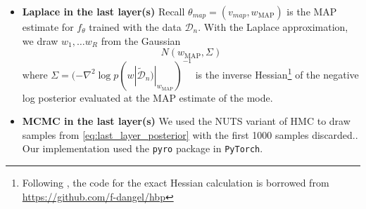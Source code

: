 \documentclass{article} %
\begin{document}
\begin{itemize}
	\item \textbf{Laplace in the last layer(s)}
	Recall $\theta_{map} = (v_{map}, w_{\operatorname{MAP}})$ is the MAP estimate for $f_\theta$ trained with the data $\mathcal D_n$. With the Laplace approximation, we draw $w_1,\ldots w_R$ from the Gaussian
	\[
	N(w_{\operatorname{MAP}}, \Sigma)
	\]
	where $\Sigma = (- \nabla^2 \log p(w| \tilde{\mathcal D}_n) |_{w_{\operatorname{MAP}}})^{-1}$ is the inverse Hessian\footnote{Following \citet{kristiadi_being_2020}, the code for the exact Hessian calculation is borrowed from \url{https://github.com/f-dangel/hbp}} of the negative log posterior evaluated at the MAP estimate of the mode.
	\item \textbf{MCMC in the last layer(s)}
	We used the NUTS variant of HMC to draw samples from \eqref{eq:last_layer_posterior} with the first 1000 samples  discarded.. Our implementation used the \texttt{pyro} package in \texttt{PyTorch}.
	
\end{itemize}
\end{document}
